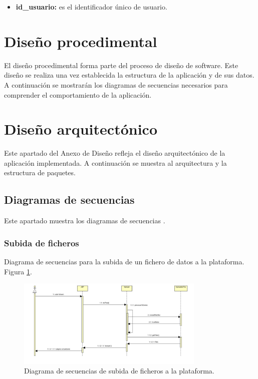 \begin{itemize}
	\item \textbf{id\_usuario:} es el identificador único de usuario.
\end{itemize}

\section{Diseño procedimental}

El diseño procedimental forma parte del proceso de diseño de software. Este diseño se realiza una vez establecida la estructura de la aplicación y de sus datos.
A continuación se mostrarán los diagramas de secuencias necesarios para comprender el comportamiento de la aplicación.

\section{Diseño arquitectónico}
Este apartado del Anexo de Diseño refleja el diseño arquitectónico de la aplicación implementada. A continuación se muestra al arquitectura y la estructura de paquetes.


\subsection{Diagramas de secuencias}
Este apartado muestra los diagramas de secuencias \cite{seq:info}.

\subsubsection{Subida de ficheros}
Diagrama de secuencias para la subida de un fichero de datos a la plataforma. Figura \ref{subida}.

\begin{figure}[!htbp]
  \centering
    \includegraphics[width=0.8\textwidth]{../img/diagramas/secuencias/4.jpg}
  \caption{Diagrama de secuencias de subida de ficheros a la plataforma.}
  \label{subida}
\end{figure}

